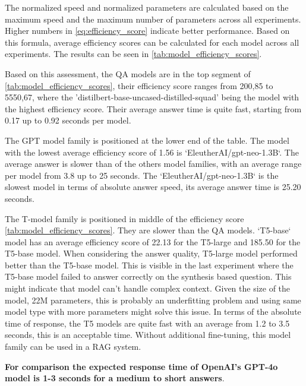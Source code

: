 \documentclass{wseas}
\begin{document}
The normalized speed and normalized parameters are calculated based on the maximum speed and the
maximum number of parameters across all experiments. Higher numbers in \autoref{eq:efficiency_score}
indicate better performance. Based on this formula, average efficiency scores can be calculated 
for each model across all experiments. The results can be seen in \autoref{tab:model_efficiency_scores}.

Based on this assessment, the QA models are in the top segment of  \autoref{tab:model_efficiency_scores},
their efficiency score ranges from 200,85 to 5550,67, where the 'distilbert-base-uncased-distilled-squad'
being the model with the highest efficiency score. Their average answer time is quite fast, starting from 0.17 up
to 0.92 seconds per model.

The GPT model family is positioned at the lower end of the table. The model with the lowest average efficiency score
of 1.56 is `EleutherAI/gpt-neo-1.3B`. The average answer is slower than of the others model families, with an average range per model
from 3.8 up to 25 seconds. The `EleutherAI/gpt-neo-1.3B` is the slowest model in terms of absolute answer speed,
its average answer time is 25.20 seconds.

The T-model family is positioned in middle of the efficiency score \autoref{tab:model_efficiency_scores}. They are slower than the QA models. 
`T5-base` model has an average efficiency score of 22.13 for the T5-large and 185.50 for the T5-base model. When considering the 
answer quality, T5-large model performed better than the T5-base model. This is visible in the last experiment where the T5-base model
failed to answer correctly on the synthesis based question. This might indicate that model can't handle complex context. 
Given the size of the model, 22M parameters, this is probably an underfitting problem and using same model type 
with more parameters might solve this issue. In terms of the absolute time of response, the T5 models
are quite fast with an average from 1.2 to 3.5 seconds, this is an acceptable time. Without additional
fine-tuning, this model family can be used in a RAG system.

\textbf{For comparison the expected response time of OpenAI's GPT-4o model is 1-3 seconds for a medium to short answers}.
\end{document}
